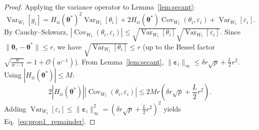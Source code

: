 \documentclass[11pt,a4paper]{article}
\begin{document}
\begin{proof}
Applying the variance operator to Lemma~\ref{lem:secant}:
\begin{equation}
\operatorname{Var}_{W_t}[g_i] = H_{ii}(\boldsymbol{\theta}^*)^2 \operatorname{Var}_{W_t}[\theta_i] + 2 H_{ii}(\boldsymbol{\theta}^*) \operatorname{Cov}_{W_t}(\theta_i, \varepsilon_i) + \operatorname{Var}_{W_t}[\varepsilon_i].
\end{equation}
By Cauchy--Schwarz, $|\operatorname{Cov}_{W_t}(\theta_i, \varepsilon_i)| \le \sqrt{\operatorname{Var}_{W_t}[\theta_i]} \sqrt{\operatorname{Var}_{W_t}[\varepsilon_i]}$. Since $\|\boldsymbol{\theta}_\tau - \boldsymbol{\theta}^*\| \le r$, we have $\sqrt{\operatorname{Var}_{W_t}[\theta_i]} \le r$ (up to the Bessel factor $\sqrt{\frac{w}{w-1}} = 1 + \mathcal{O}(w^{-1})$). From Lemma~\ref{lem:secant}, $\|\boldsymbol{\varepsilon}_i\|_\infty \le \delta r \sqrt{p} + \frac{L}{2} r^2$. Using $|H_{ii}(\boldsymbol{\theta}^*)| \le M$:
\begin{equation}
2 |H_{ii}(\boldsymbol{\theta}^*)| |\operatorname{Cov}_{W_t}(\theta_i, \varepsilon_i)| \le 2 M r \left( \delta r \sqrt{p} + \frac{L}{2} r^2 \right).
\end{equation}
Adding $\operatorname{Var}_{W_t}[\varepsilon_i] \le \|\boldsymbol{\varepsilon}_i\|_\infty^2 = (\delta r \sqrt{p} + \frac{L}{2} r^2)^2$ yields Eq.~\eqref{eq:prop1_remainder}.
\end{proof}
\end{document}
